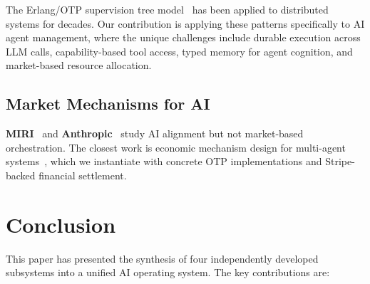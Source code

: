 \documentclass[12pt,a4paper]{article}
\theoremstyle{definition}
\begin{document}
The Erlang/OTP supervision tree model~\citep{armstrong2003thesis} has been
applied to distributed systems for decades. Our contribution is applying
these patterns specifically to AI agent management, where the unique challenges
include durable execution across LLM calls, capability-based tool access,
typed memory for agent cognition, and market-based resource allocation.

\subsection{Market Mechanisms for AI}

\textbf{MIRI}~\citep{soares2015corrigibility} and
\textbf{Anthropic}~\citep{bai2022constitutional} study AI alignment but not
market-based orchestration. The closest work is economic mechanism design
for multi-agent systems~\citep{shoham2009multiagent}, which we instantiate
with concrete OTP implementations and Stripe-backed financial settlement.


\section{Conclusion}\label{sec:conclusion}

This paper has presented the synthesis of four independently developed subsystems
into a unified AI operating system. The key contributions are:
\end{document}
